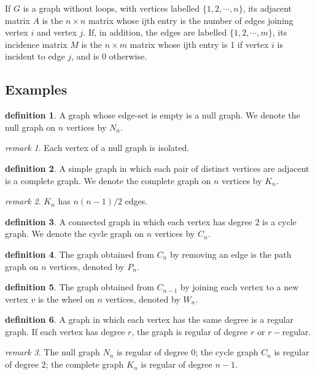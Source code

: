 \documentclass[a4paper,11pt]{article}%
\theoremstyle{remark}
\newtheorem*{remark}{remark}
\theoremstyle{definition}
\theoremstyle{definition}
\theoremstyle{definition}
\theoremstyle{definition}
\newtheorem*{definition}{definition}
\theoremstyle{plain}
\theoremstyle{definition}
\begin{document}
If $G$ is a graph without loops, with vertices labelled $\{1,2,\cdots,n\}$,
its adjacent matrix $A$ is the $n\times n$ matrix whose ijth entry is the 
number of edges joining vertex $i$ and vertex $j$. If, in addition, the edges 
are labelled $\{1,2,\cdots,m\}$, its incidence matrix $M$ is the $n\times m$
matrix whose ijth entry is 1 if vertex $i$ is incident to edge $j$, and is 0 otherwise.
\subsection{Examples}
\begin{definition}
    A graph whose edge-set is empty is a null graph. We denote the null graph on $n$ vertices by $N_n$.
\end{definition}
\begin{remark}
    Each vertex of a null graph is isolated.
\end{remark}
\begin{definition}
    A simple graph in which each pair of distinct vertices are adjacent is a 
    complete graph. We denote the complete graph on $n$ vertices by $K_n$.
\end{definition}
\begin{remark}
    $K_n$ has $n(n-1)/2$ edges.
\end{remark}
\begin{definition}
    A connected graph in which each vertex has degree 2 is a cycle graph.
    We denote the cycle graph on $n$ vertices by $C_n$.
\end{definition}
\begin{definition}
    The graph obtained from $C_n$ by removing an edge is the path graph on $n$ 
    vertices, denoted by $P_n$.
\end{definition}
\begin{definition}
    The graph obtained from $C_{n-1}$ by joining each vertex to a new vertex 
    $v$ is the wheel on  $n$ vertices, denoted by $W_n$.
\end{definition}
\begin{definition}
    A graph in which each vertex has the same degree is a regular 
    graph. If each vertex has degree $r$, the graph is regular of 
    degree $r$ or $r-$regular.
\end{definition}
\begin{remark}
    The null graph $N_n$ is regular of degree 0; the cycle graph $C_n$
    is regular of degree 2; the complete graph $K_n$ is regular of 
    degree $n-1$.
\end{remark}
\end{document}
